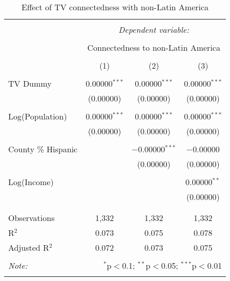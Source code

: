
\begin{table}[!htbp] \centering 
  \caption{Effect of TV connectedness with non-Latin America} 
  \label{} 
\begin{tabular}{@{\extracolsep{-5pt}}lccc} 
\\[-1.8ex]\hline 
\hline \\[-1.8ex] 
 & \multicolumn{3}{c}{\textit{Dependent variable:}} \\ 
\cline{2-4} 
\\[-1.8ex] & \multicolumn{3}{c}{Connectedness to non-Latin America} \\ 
\\[-1.8ex] & (1) & (2) & (3)\\ 
\hline \\[-1.8ex] 
 TV Dummy & 0.00000$^{***}$ & 0.00000$^{***}$ & 0.00000$^{***}$ \\ 
  & (0.00000) & (0.00000) & (0.00000) \\ 
  & & & \\ 
 Log(Population) & 0.00000$^{***}$ & 0.00000$^{***}$ & 0.00000$^{***}$ \\ 
  & (0.00000) & (0.00000) & (0.00000) \\ 
  & & & \\ 
 County \% Hispanic &  & $-$0.00000$^{***}$ & $-$0.00000 \\ 
  &  & (0.00000) & (0.00000) \\ 
  & & & \\ 
 Log(Income) &  &  & 0.00000$^{**}$ \\ 
  &  &  & (0.00000) \\ 
  & & & \\ 
\hline \\[-1.8ex] 
Observations & 1,332 & 1,332 & 1,332 \\ 
R$^{2}$ & 0.073 & 0.075 & 0.078 \\ 
Adjusted R$^{2}$ & 0.072 & 0.073 & 0.075 \\ 
\hline 
\hline \\[-1.8ex] 
\textit{Note:}  & \multicolumn{3}{r}{$^{*}$p$<$0.1; $^{**}$p$<$0.05; $^{***}$p$<$0.01} \\ 
 & \multicolumn{3}{r}{} \\ 
\end{tabular} 
\end{table} 
